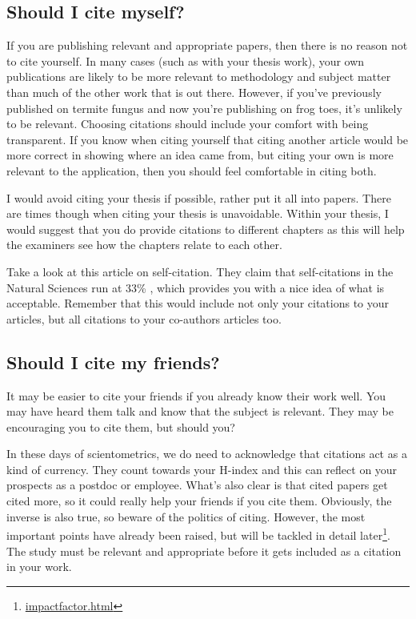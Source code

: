 \documentclass[
]{krantz}
\renewcommand{\href}[2]{#2\footnote{\url{#1}}}
\begin{document}
\hypertarget{should-i-cite-myself}{%
\subsection{Should I cite myself?}\label{should-i-cite-myself}}

If you are publishing relevant and appropriate papers, then there is no reason not to cite yourself. In many cases (such as with your thesis work), your own publications are likely to be more relevant to methodology and subject matter than much of the other work that is out there. However, if you've previously published on termite fungus and now you're publishing on frog toes, it's unlikely to be relevant. Choosing citations should include your comfort with being transparent. If you know when citing yourself that citing another article would be more correct in showing where an idea came from, but citing your own is more relevant to the application, then you should feel comfortable in citing both.

I would avoid citing your thesis if possible, rather put it all into papers. There are times though when citing your thesis is unavoidable. Within your thesis, I would suggest that you do provide citations to different chapters as this will help the examiners see how the chapters relate to each other.

Take a look at this article on self-citation. They claim that self-citations in the Natural Sciences run at 33\% \citep{vanraan2007scoping}, which provides you with a nice idea of what is acceptable. Remember that this would include not only your citations to your articles, but all citations to your co-authors articles too.

\hypertarget{should-i-cite-my-friends}{%
\subsection{Should I cite my friends?}\label{should-i-cite-my-friends}}

It may be easier to cite your friends if you already know their work well. You may have heard them talk and know that the subject is relevant. They may be encouraging you to cite them, but should you?

In these days of scientometrics, we do need to acknowledge that citations act as a kind of currency. They count towards your H-index \citep{hirsch2005index} and this can reflect on your prospects as a postdoc or employee. What's also clear is that cited papers get cited more, so it could really help your friends if you cite them. Obviously, the inverse is also true, so beware of the politics of citing. However, the most important points have already been raised, but will be tackled \href{impactfactor.html}{in detail later}. The study must be relevant and appropriate before it gets included as a citation in your work.
\end{document}
